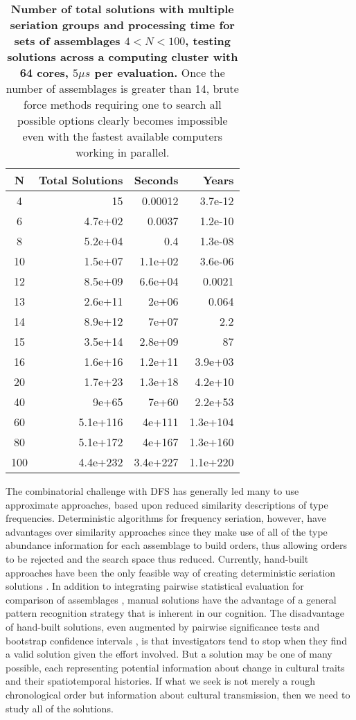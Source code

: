 \documentclass[10pt,letterpaper]{article}
\begin{document}
\begin{table}[ht]
\centering
\begin{tabular}{|c|r|r|r|}
  \hline
N & Total Solutions & Seconds & Years \\
  \hline
  4 &  15 & 0.00012 & 3.7e-12 \\
    6 & 4.7e+02 & 0.0037 & 1.2e-10 \\
    8 & 5.2e+04 & 0.4 & 1.3e-08 \\
   10 & 1.5e+07 & 1.1e+02 & 3.6e-06 \\
   12 & 8.5e+09 & 6.6e+04 & 0.0021 \\
   13 & 2.6e+11 & 2e+06 & 0.064 \\
   14 & 8.9e+12 & 7e+07 & 2.2 \\
   15 & 3.5e+14 & 2.8e+09 &  87 \\
   16 & 1.6e+16 & 1.2e+11 & 3.9e+03 \\
   20 & 1.7e+23 & 1.3e+18 & 4.2e+10 \\
   40 & 9e+65 & 7e+60 & 2.2e+53 \\
   60 & 5.1e+116 & 4e+111 & 1.3e+104 \\
   80 & 5.1e+172 & 4e+167 & 1.3e+160 \\
  100 & 4.4e+232 & 3.4e+227 & 1.1e+220 \\
   \hline
\end{tabular}
\caption{{\bf Number of total solutions with multiple seriation groups and processing time for sets of assemblages $4 < N < 100$, testing solutions across a computing cluster with 64 cores, $5\mu s$ per evaluation.}   Once the number of assemblages is greater than 14, brute force methods requiring one to search all possible options clearly becomes impossible even with the fastest available computers working in parallel.}
\label{tab:total-mult}
\end{table}

The combinatorial challenge with DFS has generally led many to use approximate approaches, based upon reduced similarity descriptions of type frequencies. Deterministic algorithms for frequency seriation, however, have advantages over similarity approaches since they make use of all of the type abundance information for each assemblage to build orders, thus allowing orders to be rejected and the search space thus reduced. Currently, hand-built approaches have been the only feasible way of creating deterministic seriation solutions \cite{Lipo1997Population,Lipo2001,Lipo2008}. In addition to integrating pairwise statistical evaluation for comparison of assemblages \cite{Lipo1997Population}, manual solutions have the advantage of a general pattern recognition strategy that is inherent in our cognition. The disadvantage of hand-built solutions, even augmented by pairwise significance tests and bootstrap confidence intervals \cite{Lipo1997Population}, is that investigators tend to stop when they find a valid solution given the effort involved. But a solution may be one of many possible, each representing potential information about change in cultural traits and their spatiotemporal histories.  If what we seek is not merely a rough chronological order but information about cultural transmission, then we need to study all of the solutions.
\end{document}
